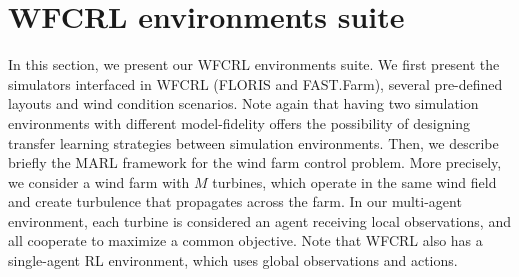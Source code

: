 \documentclass{article}
\newcommand{\md}[1]{{\color{red}#1}}
\begin{document}
\section{WFCRL environments suite} \label{sec:wfcrl_suite}
%
In this section, we present our WFCRL environments suite.
We first present the simulators interfaced in WFCRL  (FLORIS and FAST.Farm), several pre-defined layouts and wind condition scenarios. 
Note again that having two simulation environments with different model-fidelity offers the possibility of designing transfer learning strategies between simulation environments.
Then, we describe briefly the MARL framework for the wind farm control problem. More precisely, we consider a wind farm with $M$ turbines, which operate in the same wind field and create turbulence that propagates across the farm. In our multi-agent environment, each turbine is considered an agent receiving local observations, and all cooperate to maximize a common objective. Note that WFCRL also has a single-agent RL environment, which uses global observations and actions.

\medskip
\end{document}
